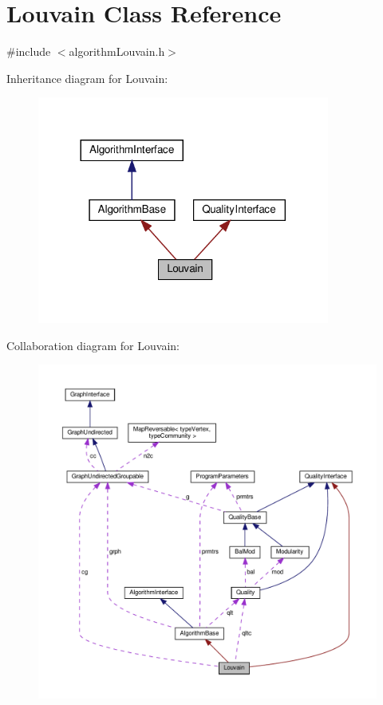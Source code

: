 \hypertarget{classLouvain}{}\section{Louvain Class Reference}
\label{classLouvain}


{\ttfamily \#include $<$algorithm\+Louvain.\+h$>$}



Inheritance diagram for Louvain\+:
\nopagebreak
\begin{figure}[H]
\begin{center}
\leavevmode
\includegraphics[width=272pt]{classLouvain__inherit__graph}
\end{center}
\end{figure}


Collaboration diagram for Louvain\+:
\nopagebreak
\begin{figure}[H]
\begin{center}
\leavevmode
\includegraphics[width=350pt]{classLouvain__coll__graph}
\end{center}
\end{figure}
